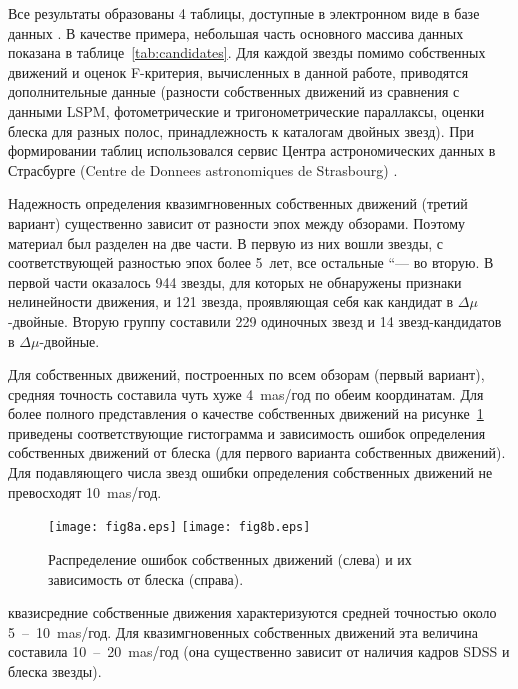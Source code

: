 Все результаты образованы 4 таблицы, доступные в электронном виде в базе данных . В качестве примера, небольшая часть основного массива данных показана в таблице~\ref{tab:candidates}. Для каждой звезды помимо собственных движений и оценок F-критерия, вычисленных в данной работе, приводятся дополнительные данные (разности собственных движений из сравнения с данными LSPM, фотометрические и тригонометрические параллаксы, оценки блеска для разных полос, принадлежность к каталогам двойных звезд). При формировании таблиц использовался сервис Центра астрономических данных в Страсбурге (Centre de Donnees astronomiques de Strasbourg) .

Надежность определения квазимгновенных собственных движений (третий вариант) существенно зависит от разности эпох между обзорами. Поэтому материал был разделен на две части. В первую из них вошли звезды, с соответствующей разностью эпох более 5~лет, все остальные “--- во вторую. В первой части оказалось 944 звезды, для которых не обнаружены признаки нелинейности движения, и 121 звезда, проявляющая себя как кандидат в $\Delta\mu$-двойные. Вторую группу составили 229 одиночных звезд  и 14 звезд-кандидатов в $\Delta\mu$-двойные.

Для собственных движений, построенных по всем обзорам (первый вариант), средняя точность составила чуть хуже 4~mas/год по обеим координатам. Для более полного представления о качестве собственных движений на рисунке~\ref{fig:15emu} приведены соответствующие гистограмма и зависимость ошибок определения собственных движений от блеска (для первого варианта собственных движений). Для подавляющего числа звезд ошибки определения собственных движений не превосходят 10~mas/год.

\begin{figure}[h]
\centering
\texttt{[image: fig8a.eps]}
\texttt{[image: fig8b.eps]}
\caption{Распределение ошибок собственных движений (слева) и их зависимость от блеска (справа).}
\label{fig:15emu}
\end{figure}

квазисредние собственные движения характеризуются средней точностью около 5~--~10~mas/год. Для квазимгновенных собственных движений эта величина составила 10~--~20~mas/год (она существенно зависит от наличия кадров SDSS и блеска звезды).

